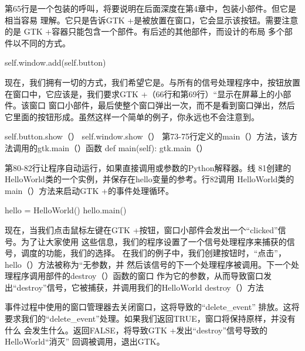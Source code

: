 

 第65行是一个包装的呼叫，将要说明在后面深度在第4章中，包装小部件。但它是相当容易
 理解。它只是告诉GTK +是被放置在窗口，它会显示该按钮。需要注意的是
 GTK +容器只能包含一个部件。有后述的其他部件，而设计的布局
 多个部件以不同的方式。

 self.window.add(self.button)

 现在，我们拥有一切的方式，我们希望它是。与所有的信号处理程序中，按钮放置
 在窗口中，它应该是，我们要求GTK +（66行和第69行）“显示在屏幕上的小部件。该窗口
 窗口小部件，最后使整个窗口弹出一次，而不是看到窗口弹出，然后
 它里面的按钮形成。虽然这样一个简单的例子，你永远也不会注意到。	

 self.button.show（）
 self.window.show（）
 第73-75行定义的main（）方法，该方法调用的gtk.main（）函数
def main(self):
	gtk.main（）

	第80-82行让程序自动运行，如果直接调用或参数的Python解释器。线
	81创建的HelloWorld类的一个实例，并保存在hello变量的参考。行82调用
	HelloWorld类的ma​​in（）方法来启动GTK +的事件处理循环。

	hello = HelloWorld()
	hello.main()


现在，当我们点击鼠标左键在GTK +按钮，窗口小部件会发出一个“clicked”信号。为了让大家使用
这些信息，我们的程序设置了一个信号处理程序来捕获的信号，调度的功能，我们的选择。
在我们的例子中，我们创建按钮时，“点击”，hello（）方法被称为“无参数，并
然后该信号的下一个处理程序被调用。下一个处理程序调用部件的destroy（）函数的窗口
作为它的参数，从而导致窗口发出“destroy”信号，它被捕获，并调用我们的HelloWorld
destroy（）方法


事件过程中使用的窗口管理器去关闭窗口，这将导致的“delete\_event”
排放。这将要求我们的“delete\_event”处理。如果我们返回TRUE，窗口将保持原样，并没有什么
会发生什么。返回FALSE，将导致GTK +发出“destroy”信号导致的HelloWorld“消灭”
回调被调用，退出GTK。	

